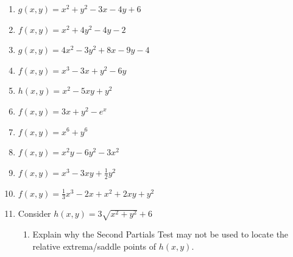 \documentclass[12pt]{article}
\newif\ifans
\begin{document}
\begin{enumerate}

\item $g(x,y)=x^2+y^2-3x-4y+6$ 

\ifans{\fbox{Relative minimum at $\left(\frac{3}{2},2\right)$ }} \fi

\item $f(x,y)=x^2+4y^2-4y-2$ 

\ifans{\fbox{Relative minimum at $\left(0,\frac{1}{2}\right)$}} \fi

\item $g(x,y)=4x^2-3y^2+8x-9y-4$ 

\ifans{\fbox{Saddle point at $\left(-1,-\frac{3}{2}\right)$}} \fi

\item $f(x,y)=x^3-3x+y^2-6y$

\ifans{\fbox{Relative minimum at $(1,3)$; Saddle point at $(-1,3)$}} \fi

\item $h(x,y)=x^2-5xy+y^2$ 

\ifans{\fbox{Saddle point at $(0,0)$}} \fi

\item $f(x,y)=3x+y^2-e^x$

\ifans{\fbox{Saddle point at $(\ln{3},0)$}} \fi

\item $f(x,y)=x^6+y^6$

\ifans{\fbox{Relative minimum at $(0,0)$}} \fi

\item $f(x,y)=x^2y-6y^2-3x^2$

\ifans{\fbox{Relative maximum at $(0,0)$; Saddle points at $(6,3)$ and $(-6,3)$}} \fi

\item $f(x,y)=x^3-3xy+\frac{1}{2}y^2$

\ifans{\fbox{Relative minimum at $(3,9)$; Saddle point at $(0,0)$}} \fi

\item $f(x,y)=\frac{1}{3}x^3-2x+x^2+2xy+y^2$

\ifans{\fbox{Relative minimum at $\left(\sqrt{2},-\sqrt{2}\right)$; Saddle point at $\left(-\sqrt{2},\sqrt{2}\right)$}} \fi

\item Consider $h(x,y)=3\sqrt{x^2+y^2}+6$

\begin{enumerate}

\item Explain why the Second Partials Test may not be used to locate the relative extrema/saddle points of $h(x,y)$.  


\end{enumerate}
\end{enumerate}
\end{document}
